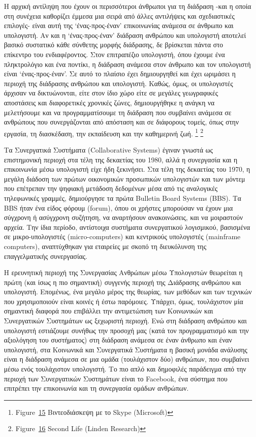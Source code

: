 \documentclass[
]{article}
\begin{document}
Η αρχική αντίληψη που έχουν οι περισσότεροι άνθρωποι για τη διάδραση
-και η οποία στη συνέχεια καθορίζει έμμεσα μια σειρά από άλλες
αντιλήψεις και σχεδιαστικές επιλογές- είναι αυτή της `ένας-προς-έναν'
επικοινωνίας ανάμεσα σε άνθρωπο και υπολογιστή. Αν και η
`ένας-προς-έναν' διάδραση ανθρώπου και υπολογιστή αποτελεί βασικό
συστατικό κάθε σύνθετης μορφής διάδρασης, δε βρίσκεται πάντα στο
επίκεντρο του ενδιαφέροντος. Στον επιτραπέζιο υπολογιστή, όπου έχουμε
ένα πληκτρολόγιο και ένα ποντίκι, η διάδραση ανάμεσα στον άνθρωπο και
τον υπολογιστή είναι `ένας-προς-έναν'. Σε αυτό το πλαίσιο έχει
δημιουργηθεί και έχει ωριμάσει η περιοχή της διάδρασης ανθρώπου και
υπολογιστή. Καθώς, όμως, οι υπολογιστές άρχισαν να δικτυώνονται, είτε
στον ίδιο χώρο είτε σε μεγάλες γεωγραφικές αποστάσεις και διαφορετικές
χρονικές ζώνες, δημιουργήθηκε η ανάγκη να μελετήσουμε και να
προγραμματίσουμε τη διάδραση που συμβαίνει ανάμεσα σε ανθρώπους που
συνεργάζονται από απόσταση και σε διάφορους τομείς, όπως στην εργασία,
τη διασκέδαση, την εκπαίδευση και την καθημερινή ζωή. \footnote{Figure~\protect\hyperlink{fig:skype-video-call}{15}
  Βιντεοδιάσκεψη με το Skype (Microsoft)} \footnote{Figure~\protect\hyperlink{fig:second-life}{16}
  Second Life (Linden Research)}

Τα Συνεργατικά Συστήματα (Collaborative Systems) έγιναν γνωστά ως
επιστημονική περιοχή στα τέλη της δεκαετίας του 1980, αλλά η συνεργασία
και η επικοινωνία μέσω υπολογιστή είχε ήδη ξεκινήσει. Στα τέλη της
δεκαετίας του 1970, η μεγάλη διάδοση των πρώτων οικονομικών προσωπικών
υπολογιστών και των μόντεμ που επέτρεπαν την ψηφιακή μετάδοση δεδομένων
μέσα από τις αναλογικές τηλεφωνικές γραμμές, δημιούργησε τα πρώτα
Bulletin Board Systems (BBS). Τα BBS ήταν ένα είδος φόρουμ (forum), όπου
οι χρήστες μπορούσαν να έχουν μια σύγχρονη ή ασύγχρονη συζήτηση, να
αναρτήσουν ανακοινώσεις, και να μοιραστούν αρχεία. Την ίδια περίοδο,
αντίστοιχα συστήματα συνεργατικού λογισμικού, βασισμένα σε
μικρο-υπολογιστές (micro-computers) και κεντρικούς υπολογιστές
(mainframe computers), αναπτύχθηκαν για εταιρείες με σκοπό τη
διευκόλυνση της επαγγελματικής συνεργασίας.

Η ερευνητική περιοχή της Συνεργασίας Ανθρώπων μέσω Υπολογιστών θεωρείται
η πρώτη (και ίσως η πιο σημαντική) συγγενής περιοχή της Διάδρασης
ανθρώπου και υπολογιστή. Επομένως, ένα μεγάλο μέρος της θεωρίας, των
μεθόδων και των τεχνικών που χρησιμοποιούν είναι κοινές ή έστω
παρόμοιες. Υπάρχει, όμως, τουλάχιστον μία σημαντική διαφορά που
επιβάλλει την αντιμετώπιση των Κοινωνικών και Συνεργατικών Συστημάτων ως
ξεχωριστή περιοχή. Ενώ στη διάδραση ανθρώπου και υπολογιστή εστιάζουμε
συνήθως την προσοχή μας (κατά τον προγραμματισμό και την αξιολόγηση του
συστήματος) στη διάδραση ανάμεσα σε έναν άνθρωπο και έναν υπολογιστή,
στα Κοινωνικά και Συνεργατικά Συστήματα η βασική μονάδα ανάλυσης είναι η
διάδραση ανάμεσα σε μια ομάδα (τουλάχιστον δύο) ανθρώπων, που συμβαίνει
μέσω ενός τουλάχιστον υπολογιστή. Το πιο απλό και δημοφιλές παράδειγμα
από την περιοχή των Συνεργατικών Συστημάτων είναι το Facebook, ένα
σύστημα που επιτρέπει την επικοινωνία και τη συνεργασία ομάδων ανθρώπων.
\end{document}
